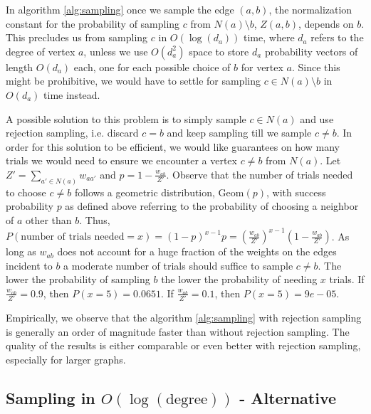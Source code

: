 \documentclass{article}
\begin{document}
In algorithm \ref{alg:sampling} once we sample the edge
$(a,b)$, the normalization constant for the probability
of sampling $c$ from $N(a) \setminus b$, $Z(a,b)$, 
depends on $b$. This precludes us from sampling $c$
in $O(\log(d_a))$ time, where $d_a$ refers to the degree
of vertex $a$, unless we use $O(d_a^2)$ space to store
$d_a$ probability vectors of length $O(d_a)$ each, one
for each possible choice of $b$ for vertex $a$. Since
this might be prohibitive, we would have to settle for
sampling $c \in N(a) \setminus b$ in $O(d_a)$ time
instead.

A possible solution to this problem is to simply sample
$c \in N(a)$ and use rejection sampling, i.e. discard
$c = b$ and keep sampling till we sample $c \neq b$.
In order for this solution to be efficient, we would like
guarantees on how many trials we would need to ensure
we encounter a vertex $c \neq b$ from $N(a)$.
Let $Z' = \sum\limits_{a' \in N(a)} w_{aa'}$ and
$p = 1 - \frac{w_{ab}}{Z'}$. Observe that the number of
trials needed to choose $c \neq b$ follows a geometric
distribution, $\text{Geom}(p)$, with success probability
$p$ as defined above referring to the probability of
choosing a neighbor of $a$ other than $b$. Thus,
$P(\text{number of trials needed} = x) = (1-p)^{x-1} p
= (\frac{w_{ab}}{Z'})^{x-1} (1 - \frac{w_{ab}}{Z'})$.
As long as $w_{ab}$ does not account for a huge fraction
of the weights on the edges incident to $b$ a moderate
number of trials should suffice to sample $c \neq b$.
The lower the probability of sampling $b$ the lower the 
probability of needing $x$ trials. If
$\frac{w_{ab}}{Z'} = 0.9$, then $P(x=5) = 0.0651$.
If $\frac{w_{ab}}{Z'} = 0.1$, then $P(x=5) = 9e-05$.

Empirically, we observe that the algorithm \ref{alg:sampling}
with rejection sampling is generally an order of magnitude faster
than without rejection sampling. The quality of the results is
either comparable or even better with rejection sampling, especially
for larger graphs.


\subsection{Sampling in $O(\log(\text{degree}))$ - Alternative}
\label{sec:alt_sampling}
\end{document}
